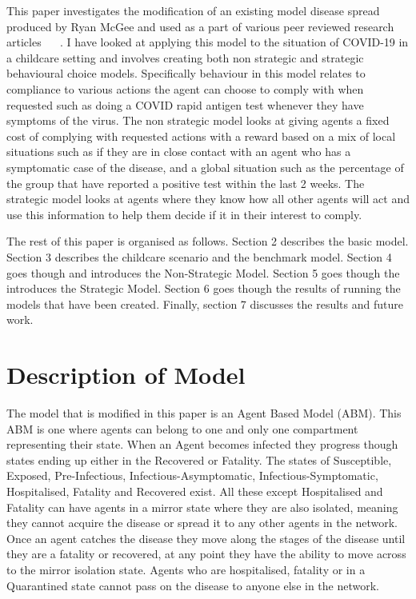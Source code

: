 \documentclass{article}
\begin{document}
This paper investigates the modification of an existing model disease spread produced by Ryan McGee and used as a part of various peer reviewed research articles ~\cite{mcgee_homburger_williams_bergstrom_zhou_2021} ~\cite{mcgee_homburger_williams_bergstrom_zhou_2021_2}. 
I have looked at applying this model to the situation of COVID-19 in a childcare setting and involves creating both non strategic and strategic behavioural choice models. Specifically behaviour in this model relates to compliance to various actions the agent can choose to comply with when requested such as doing a COVID rapid antigen test whenever they have symptoms of the virus. The non strategic model looks at giving agents a fixed cost of complying with requested actions with a reward based on a mix of local situations such as if they are in close contact with an agent who has a symptomatic case of the disease, and a global situation such as the percentage of the group that have reported a positive test within the last 2 weeks. The strategic model looks at agents where they know how all other agents will act and use this information to help them decide if it in their interest to comply.\newline

The rest of this paper is organised as follows. Section 2 describes the basic model. Section 3 describes the childcare scenario and the benchmark model. Section 4 goes though and introduces the Non-Strategic Model. Section 5 goes though the introduces the Strategic Model. Section 6 goes though the results of running the models that have been created. Finally, section 7 discusses the results and future work.


\section{Description of Model \label{description}}
The model that is modified in this paper is an Agent Based Model (ABM). This ABM is one where agents can belong to one and only one compartment representing their state. When an Agent becomes infected they progress though states ending up either in the Recovered or Fatality. The states of Susceptible, Exposed, Pre-Infectious, Infectious-Asymptomatic, Infectious-Symptomatic, Hospitalised, Fatality and Recovered exist. All these except Hospitalised and Fatality can have agents in a mirror state where they are also isolated, meaning they cannot acquire the disease or spread it to any other agents in the network. Once an agent catches the disease they move along the stages of the disease until they are a fatality or recovered, at any point they have the ability to move across to the mirror isolation state. Agents who are hospitalised, fatality or in a Quarantined state cannot pass on the disease to anyone else in the network.
\end{document}
